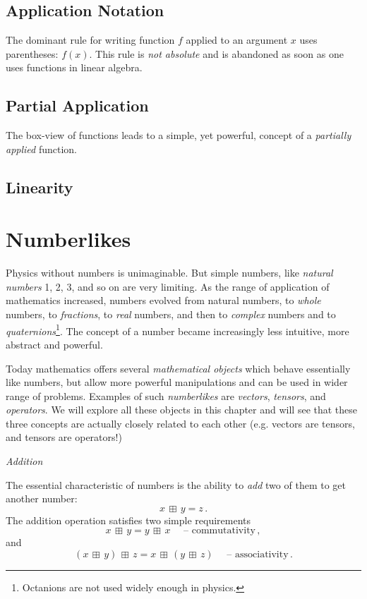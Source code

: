 \subsection{Application Notation}
The dominant rule for writing function $f$ applied to an argument $x$ uses parentheses: $f(x)$. This rule is \emph{not absolute} and is abandoned as soon as one uses functions in linear algebra.


\subsection{Partial Application}
The box-view of functions leads to a simple, yet powerful, concept of a \emph{partially applied} function.


\subsection{Linearity}


\section{Numberlikes}
Physics without numbers is unimaginable. But simple numbers, like \emph{natural numbers} 1, 2, 3, and so on are very limiting.  As the range of application of mathematics increased, numbers evolved from natural numbers, to \emph{whole} numbers, to \emph{fractions}, to \emph{real} numbers, and then to \emph{complex} numbers and to \emph{quaternions}\footnote{Octanions are not used widely enough in physics.}. The concept of a number became increasingly less intuitive, more abstract and powerful.

Today mathematics offers several \emph{mathematical objects} which behave essentially like numbers, but allow more powerful manipulations and can be used in wider range of problems. Examples of such \emph{numberlikes} are \emph{vectors}, \emph{tensors}, and \emph{operators}. We will explore all these objects in this chapter and will see that these three concepts are actually closely related to each other (e.g. vectors are tensors, and tensors are operators!)


\begin{flushleft}
	{\it Addition}
\end{flushleft}
The essential characteristic of numbers is the ability to \emph{add} two of them to get another number:
\[
x\,\boxplus\, y = z\,.
\]
The addition operation satisfies two simple requirements
\[
x\,\boxplus\, y = y\,\boxplus\, x\quad\textrm{ -- commutativity}\,,
\]
and
\[
(x\,\boxplus\, y)\,\boxplus\, z = x\,\boxplus\, (y\,\boxplus\, z) \quad\textrm{ -- associativity}\,.
\]



